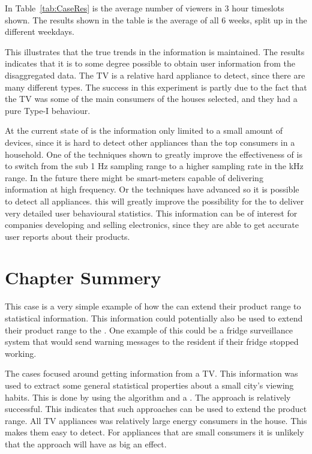 In Table~\ref{tab:CaseRes} is the average number of viewers in 3 hour timeslots shown. The results shown in the table is the average of all 6 weeks, split up in the different weekdays. 



This illustrates that the true trends in the information is maintained. The results indicates that it is to some degree possible to obtain user information from the disaggregated data. The TV is a relative hard appliance to detect, since there are many different types. The success in this experiment is partly due to the fact that the TV was some of the main consumers of the houses selected, and they had a pure Type-I behaviour.

At the current state of  is the information only limited to a small amount of devices, since it is hard to detect other appliances than the top consumers in a household. One of the techniques shown to greatly improve the effectiveness of  is to switch from the sub 1 Hz sampling range to a higher sampling rate in the kHz range. In the future there might be smart-meters capable of delivering information at high frequency. Or the  techniques have advanced so it is possible to detect all appliances. this will greatly improve the possibility for the  to deliver very detailed user behavioural statistics. This information can be of interest for companies developing and selling electronics, since they are able to get accurate user reports about their products. 

\section{Chapter Summery}
This case is a very simple example of how the  can extend their product range to statistical information. This information could potentially also be used to extend their product range to the . One example of this could be a fridge surveillance system that would send warning messages to the resident if their fridge stopped working.

The cases focused around getting information from a TV. This information was used to extract some general statistical properties about a small city's viewing habits. This is done by using the  algorithm and a . The approach is relatively successful. This indicates that such approaches can be used to extend the  product range. All TV appliances was relatively large energy consumers in the house. This makes them easy to detect. For appliances that are small consumers it is unlikely that the approach will have as big an effect. 


